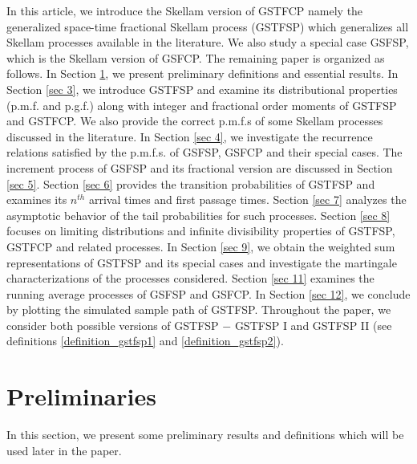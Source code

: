 \documentclass[11pt,oneside,reqno]{amsart}
\theoremstyle{definition}
\theoremstyle{remarkstyle}
\begin{document}
In this article, we introduce the Skellam version of GSTFCP namely the generalized space-time fractional Skellam process (GSTFSP) which generalizes all Skellam processes available in the literature. We also study a special case GSFSP, which is the Skellam version of GSFCP. The remaining paper is organized as follows. In Section \ref{sec 2}, we present preliminary definitions and essential results. In Section \ref{sec 3}, we introduce GSTFSP and examine its distributional properties (p.m.f. and p.g.f.) along with integer and fractional order moments of GSTFSP and GSTFCP. We also provide the correct p.m.f.s of some Skellam processes discussed in the literature. In Section \ref{sec 4}, we investigate the recurrence relations satisfied by the p.m.f.s. of GSFSP, GSFCP and their special cases. The increment process of GSFSP and its fractional version are discussed in Section \ref{sec 5}. Section \ref{sec 6} provides the transition probabilities of GSTFSP and examines its $n^{th}$ arrival times and first passage times. Section \ref{sec 7} analyzes the asymptotic behavior of the tail probabilities for such processes. Section \ref{sec 8} focuses on limiting distributions and infinite divisibility properties of GSTFSP, GSTFCP and related processes. In Section \ref{sec 9}, we obtain the weighted sum representations of GSTFSP and its special cases and investigate the martingale characterizations of the processes considered. Section \ref{sec 11} examines the running average processes of GSFSP and GSFCP. In Section \ref{sec 12}, we conclude by plotting the simulated sample path of GSTFSP. Throughout the paper, we consider both possible versions of GSTFSP $-$ GSTFSP I and GSTFSP II (see definitions \ref{definition_gstfsp1} and \ref{definition_gstfsp2}).  

\section{Preliminaries} \label{sec 2}
In this section, we present some preliminary results and definitions which will be used later in the paper.
\end{document}
